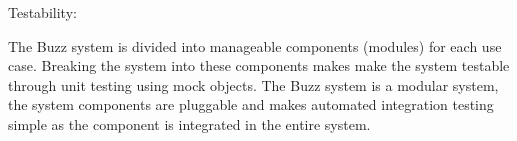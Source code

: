 \item Testability:

The Buzz system is divided into manageable components (modules) for each use case. Breaking the system into these components makes make the system testable through unit testing using mock objects. The Buzz system is a modular system, the system components are pluggable and makes automated integration testing simple as the component is integrated in the entire system.    